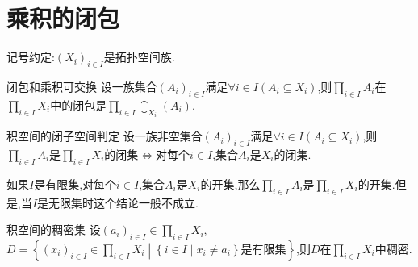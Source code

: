 \section{乘积的闭包}

记号约定:$\left(X_{i}\right)_{i\in I}$是拓扑空间族.

\begin{proposition}{闭包和乘积可交换}{}
	设一族集合$\left(A_{i}\right)_{i\in I}$满足$\forall i\in I\left(A_{i}\subseteq X_{i}\right)$,则$\prod\limits_{i\in I}A_{i}$在$\prod\limits_{i\in I}X_{i}$中的闭包是$\prod\limits_{i\in I}\closure_{X_{i}}\left(A_{i}\right)$.
\end{proposition}

\begin{proposition}{积空间的闭子空间判定}{}
	设一族非空集合$\left(A_{i}\right)_{i\in I}$满足$\forall i\in I\left(A_{i}\subseteq X_{i}\right)$,则$\prod\limits_{i\in I}A_{i}$是$\prod\limits_{i\in I}X_{i}$的闭集$\iff$对每个$i\in I$,集合$A_{i}$是$X_{i}$的闭集.
\end{proposition}

\begin{remark}{}{}
	如果$I$是有限集,对每个$i\in I$,集合$A_{i}$是$X_{i}$的开集,那么$\prod\limits_{i\in I}A_{i}$是$\prod\limits_{i\in I}X_{i}$的开集.但是,当$I$是无限集时这个结论一般不成立.
\end{remark}

\begin{proposition}{积空间的稠密集}{}
	设$\left(a_{i}\right)_{i\in I}\in\prod\limits_{i\in I}X_{i}$,$D=\left\{\left(x_{i}\right)_{i\in I}\in\prod\limits_{i\in I}X_{i}\middle|\left\{i\in I\middle|x_{i}\neq a_{i}\right\}\text{是有限集}\right\}$,则$D$在$\prod\limits_{i\in I}X_{i}$中稠密.
\end{proposition}